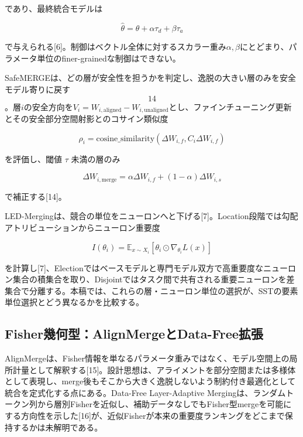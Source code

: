 であり、最終統合モデルは

\[
\hat\theta=\theta+\alpha\tau_d+\beta\tau_a
\tag{9}
\]

で与えられる[6]。制御はベクトル全体に対するスカラー重み\(\alpha,\beta\)にとどまり、パラメータ単位のfiner-grainedな制御はできない。

SafeMERGEは、どの層が安全性を担うかを判定し、逸脱の大きい層のみを安全モデル寄りに戻す\[14\]。層\(i\)の安全方向を\(V_i=W_{i,\mathrm{aligned}}-W_{i,\mathrm{unaligned}}\)とし、ファインチューニング更新とその安全部分空間射影とのコサイン類似度

\[
\rho_i=\mathrm{cosine\_similarity}(\Delta W_{i,f},C_i\Delta W_{i,f})
\tag{10}
\]

を評価し、閾値 \(\tau\) 未満の層のみ

\[
\Delta W_{i,\mathrm{merge}}=\alpha\Delta W_{i,f}+(1-\alpha)\Delta W_{i,s}
\tag{11}
\]

で補正する[14]。

LED-Mergingは、競合の単位をニューロンへと下げる[7]。Location段階では勾配アトリビューションからニューロン重要度

\[
I(\theta_i)=\mathbb{E}_{x\sim X_i}[\theta_i\odot\nabla_{\theta_i}L(x)]
\tag{12}
\]

を計算し[7]、Electionではベースモデルと専門モデル双方で高重要度なニューロン集合の積集合を取り、Disjointではタスク間で共有される重要ニューロンを差集合で分離する。本稿では、これらの層・ニューロン単位の選択が、SSTの要素単位選択とどう異なるかを比較する。

\subsection{Fisher幾何型：AlignMergeとData-Free拡張}

AlignMergeは、Fisher情報を単なるパラメータ重みではなく、モデル空間上の局所計量として解釈する[15]。設計思想は、アライメントを部分空間または多様体として表現し、merge後もそこから大きく逸脱しないよう制約付き最適化として統合を定式化する点にある。Data-Free Layer-Adaptive Mergingは、ランダムトークン列から層別Fisherを近似し、補助データなしでもFisher型mergeを可能にする方向性を示した[16]が、近似Fisherが本来の重要度ランキングをどこまで保持するかは未解明である。

